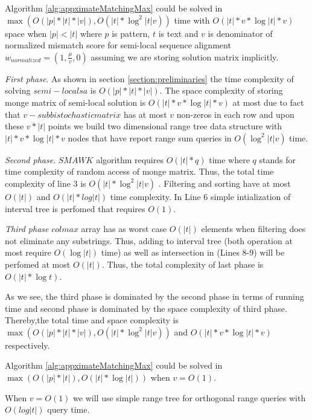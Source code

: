 \begin{theorem}
Algorithm \ref{alg:appximateMatchingMax} could  be solved in
$\max (O(|p|*|t|*|v|), O(|t|* \log^2 |t| v))$ time with $O(|t| * v * \log {|t| * v })$ space when $|p|<|t|$ where $p$ is pattern, $t$ is text and $v$ is denominator of normalized mismatch score for semi-local sequence alignment
$w_{normalized} = (1,\frac{\mu}{v},0)$ assuming we are storing solution matrix implicitly.

\emph{First phase}.
As shown in section \ref{section:preliminaries} the time complexity 
of solving $semi-local sa$ is $O(|p|*|t|*|v|)$.
The space complexity of storing monge matrix of semi-local solution is
$O(|t| * v * \log {|t| * v })$ at most due to fact that $v-subbistochastic matrix$ has at most $v$ non-zeros in each row and upon these $v * |t|$ points we 
build two dimensional range tree data structure with $|t| * v * \log {|t| * v }$ nodes that have report range sum queries in $O(\log^2 |t| v)$ time.

\emph{Second phase}.
$SMAWK$ algorithm requires $O(|t|*q)$ time where $q$ stands for time complexity of  random access of monge matrix.
Thus, the  total time complexity of line 3 is $O(|t|* \log^2 |t| v)$ .
Filtering and sorting have at most $O(|t|)$ and $O(|t|*log|t|)$ time complexity.
In Line 6 simple intialization of interval tree is perfomed that requires $O(1)$.

\emph{Third phase}
$colmax$ array has as worst case $O(|t|)$ elements when filtering does not eliminate any substrings.
Thus, adding to interval tree (both operation at most require $O(\log |t|)$ time) as well as intersection in (Lines 8-9) will be perfomed at most $O(|t|)$.
Thus, the total complexity of last phase is $O(|t|* \log t)$.

As we see, the third  phase is dominated by the second phase in terms of running time and second phase is dominated by the space complexity of third phase. 
Thereby,the total time and space complexity is $\max (O(|p|*|t|*|v|), O(|t|* \log^2 |t| v))$ and $O(|t| * v * \log {|t| * v })$  respectively.
 

\end{theorem}


\begin{corollary}
Algorithm \ref{alg:appximateMatchingMax} could  be solved in 
$\max ( O(|p| * |t|), O(|t| * \log |t|))$ when $v = O(1)$.

When $v = O(1)$ we will use simple range tree for orthogonal range queries with  $O(log|t|)$ query time.

\end{corollary}

